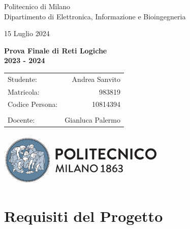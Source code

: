 \documentclass{article}
\begin{document}
\begin{titlepage}
    \vspace*{-\topskip}
    \centering

    \vspace{0.5cm} {
        \normalsize Politecnico di Milano \\ Dipartimento di Elettronica, Informazione e Bioingegneria
    }

    \vspace{5cm}
    {
        \large
        15 Luglio 2024
        \par
    }
    
    \vspace{0.25cm}
    {
        \LARGE
        \textbf{Prova Finale di Reti Logiche \\ 2023 - 2024}
        \par
    }
    
    \vspace{1.5cm}
    {
        \noindent
        \begin{center}
            \large
            \begin{tabular}{l r}
                Studente: & Andrea Sanvito \\
                Matricola: & 983819 \\
                Codice Persona: & 10814394 \\
                \\
                Docente: & Gianluca Palermo \\
            \end{tabular}
        \end{center}
    }

    \vspace{4.25cm}
    {
        \includegraphics[width=0.6\textwidth]{images/polimi_badge.png}
    }
    \vfill
    \vspace*{-3.5cm}
\end{titlepage}




\section{Requisiti del Progetto}
\end{document}

